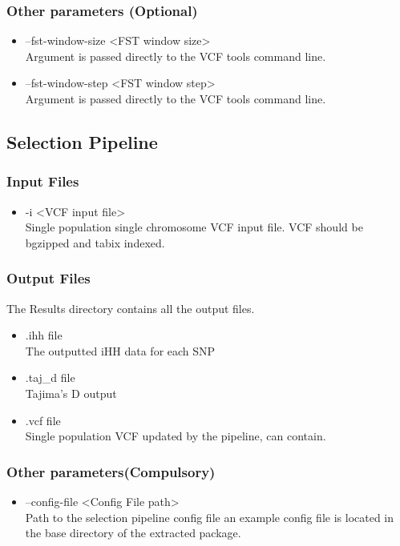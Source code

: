 \documentclass[a4paper,10pt]{article}
\begin{document}
\subsubsection{Other parameters (Optional)}
\begin{itemize}
\item --fst-window-size <FST window size>\\
Argument is passed directly to the VCF tools command line.
\item --fst-window-step <FST window step>\\
Argument is passed directly to the VCF tools command line.
\end{itemize}
\subsection{Selection Pipeline}
\subsubsection{Input Files}
\begin{itemize}
\item -i <VCF input file>\\
Single population single chromosome VCF input file. VCF should be bgzipped and tabix indexed.
\end{itemize}
\subsubsection{Output Files}
The Results directory contains all the output files.
\begin{itemize}
\item .ihh file\\
The outputted iHH data for each SNP
\item .taj\_d file\\
Tajima's D output
\item .vcf file\\
Single population VCF updated by the pipeline, can contain.
\end{itemize}
\subsubsection{Other parameters(Compulsory)}
\begin{itemize}
\item --config-file <Config File path>\\
Path to the selection pipeline config file an example config file is located in the base directory of the extracted package.
\end{itemize}
\end{document}
